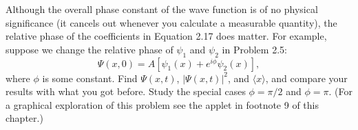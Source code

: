 \documentclass[en, oneside]{vivi}
\begin{document}
\begin{prob}
    Although the overall phase constant of the wave function is of no physical significance (it cancels out whenever you calculate a measurable quantity), the relative phase of the coefficients in Equation 2.17 does matter. For example, suppose we change the relative phase of $\psi_1$ and $\psi_2$ in Problem 2.5:
    \begin{equation*}
        \Psi(x, 0) = A \left[ \psi_1(x) + e^{i\phi}\psi_2(x) \right],
    \end{equation*}
    where $\phi$ is some constant. Find $\Psi(x, t)$, $|\Psi(x, t)|^2$, and $\langle x \rangle$, and compare your results with what you got before. Study the special cases $\phi = \pi/2$ and $\phi = \pi$. (For a graphical exploration of this problem see the applet in footnote 9 of this chapter.)
\end{prob}
\end{document}
